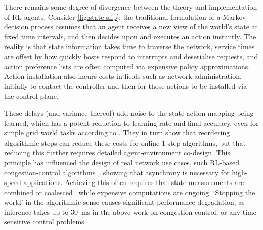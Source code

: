 There remains some degree of divergence between the theory and implementation of RL agents.
Consider \cref{fig:state-slip}: the traditional formulation of a Markov decision process assumes that an agent receives a new view of the world's state at fixed time intervals, and then decides upon and executes an action instantly.
The reality is that state information takes time to traverse the network, service times are offset by how quickly hosts respond to interrupts and deserialise requests, and action preference lists are often computed via expensive policy approximations.
Action installation also incurs costs in fields such as network administration, initially to contact the controller and then for those actions to be installed via the control plane.

These delays (and variance thereof) add noise to the state-action mapping being learned, which has a potent reduction to learning rate and final accuracy, even for simple grid world tasks according to \textcite{DBLP:journals/firai/TravnikMSP18}.
They in turn show that reordering algorithmic steps can reduce these costs for online 1-step algorithms, but that reducing this further requires detailed agent-environment co-design.
This principle has influenced the design of real network use cases, such RL-based congestion-control algorithms~\parencite{DBLP:journals/corr/abs-1910-04054}, showing that asynchrony is necessary for high-speed applications.
Achieving this often requires that state measurements are combined or coalesced~\parencite{DBLP:journals/corr/abs-1910-04054,DBLP:journals/tnsm/SimpsonRP20} while expensive computations are ongoing.
`Stopping the world' in the algorithmic sense causes significant performance degradation, as inference takes up to \SI{30}{\milli\second} in the above work on congestion control, or any time-sensitive control problems.

